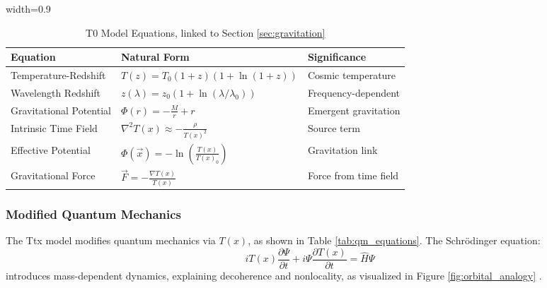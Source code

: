 \documentclass[12pt,a4paper]{article}
\newcommand{\Tfield}{T(x)}
\newcommand{\tablescale}{0.9}
\begin{document}
	\begin{table}[htbp]
		\centering
		\begin{adjustbox}{width=\tablescale\textwidth}
			\begin{tabular}{lll}
				\toprule
				\textbf{Equation} & \textbf{Natural Form} & \textbf{Significance} \\
				\midrule
				Temperature-Redshift & \(T(z) = T_0 (1+z)(1+\ln(1+z))\) & Cosmic temperature \\
				Wavelength Redshift & \(z(\lambda) = z_0 (1+\ln(\lambda/\lambda_0))\) & Frequency-dependent \\
				Gravitational Potential & \(\Phi(r) = -\frac{M}{r} + r\) & Emergent gravitation \\
				Intrinsic Time Field & \(\nabla^2 \Tfield \approx -\frac{\rho}{\Tfield^2}\) & Source term \\
				Effective Potential & \(\Phi(\vec{x}) = -\ln\left(\frac{\Tfield}{\Tfield_0}\right)\) & Gravitation link \\
				Gravitational Force & \(\vec{F} = -\frac{\nabla \Tfield}{\Tfield}\) & Force from time field \\
				\bottomrule
			\end{tabular}
		\end{adjustbox}
		\caption{T0 Model Equations, linked to Section \ref{sec:gravitation}}
		\label{tab:t0_equations}
	\end{table}
	
	\subsubsection{Modified Quantum Mechanics}
	\label{subsec:quantum}
	
	The Ttx model modifies quantum mechanics via \(\Tfield\), as shown in Table \ref{tab:qm_equations}. The Schrödinger equation:
	\[
	i \Tfield \frac{\partial \Psi}{\partial t} + i \Psi \frac{\partial \Tfield}{\partial t} = \hat{H} \Psi
	\]
	introduces mass-dependent dynamics, explaining decoherence and nonlocality, as visualized in Figure \ref{fig:orbital_analogy} \cite{pascher_quantum_2025}.
	
\end{document}
